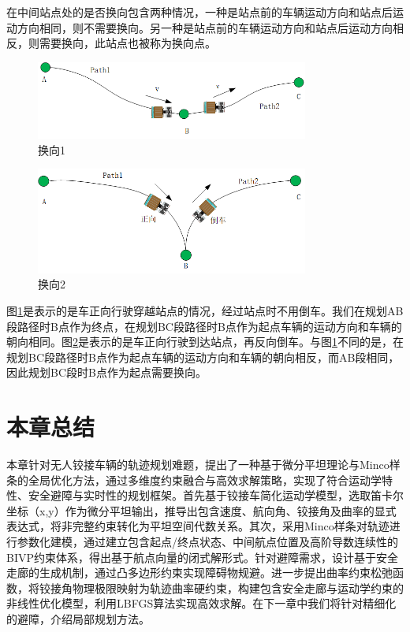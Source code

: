 \documentclass[master,academic]{ysuthesis} %
\begin{document}
		在中间站点处的是否换向包含两种情况，一种是站点前的车辆运动方向和站点后运动方向相同，则不需要换向。另一种是站点前的车辆运动方向和站点后运动方向相反，则需要换向，此站点也被称为换向点。
		\begin{figure}[!ht]
			\centering
			\includegraphics[width=0.8\textwidth]{换向1.png}
			\caption{换向1}
			\label{fig:换向1}
		\end{figure}
		\begin{figure}[!ht]
			\centering
			\includegraphics[width=0.8\textwidth]{换向2.png}
			\caption{换向2}
			\label{fig:换向2}
		\end{figure}
		图\ref{fig:换向1}是表示的是车正向行驶穿越站点的情况，经过站点时不用倒车。我们在规划AB段路径时B点作为终点，在规划BC段路径时B点作为起点车辆的运动方向和车辆的朝向相同。图\ref{fig:换向2}是表示的是车正向行驶到达站点，再反向倒车。与图\ref{fig:换向1}不同的是，在规划BC段路径时B点作为起点车辆的运动方向和车辆的朝向相反，而AB段相同，因此规划BC段时B点作为起点需要换向。

	\section{本章总结}
	本章针对无人铰接车辆的轨迹规划难题，提出了一种基于微分平坦理论与Minco样条的全局优化方法，通过多维度约束融合与高效求解策略，实现了符合运动学特性、安全避障与实时性的规划框架。首先基于铰接车简化运动学模型，选取笛卡尔坐标（x,y）作为微分平坦输出，推导出包含速度、航向角、铰接角及曲率的显式表达式，将非完整约束转化为平坦空间代数关系。其次，采用Minco样条对轨迹进行参数化建模，通过建立包含起点/终点状态、中间航点位置及高阶导数连续性的BIVP约束体系，得出基于航点向量的闭式解形式。针对避障需求，设计基于安全走廊的生成机制，通过凸多边形约束实现障碍物规避。进一步提出曲率约束松弛函数，将铰接角物理极限映射为轨迹曲率硬约束，构建包含安全走廊与运动学约束的非线性优化模型，利用LBFGS算法实现高效求解。在下一章中我们将针对精细化的避障，介绍局部规划方法。
	
\end{document}
